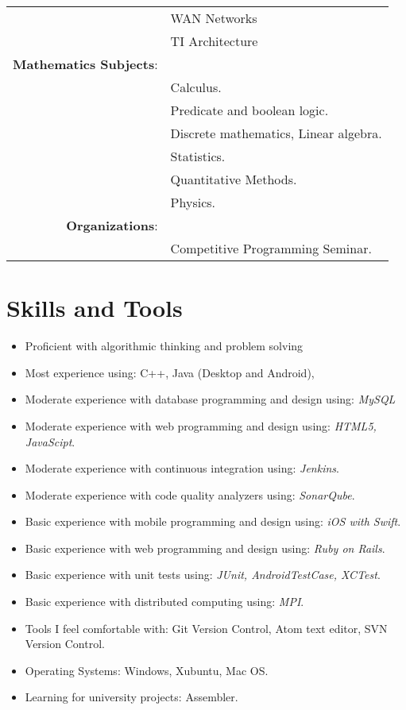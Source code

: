 \documentclass[a4paper,10pt]{article} %
\begin{document}
\begin{tabular}{rl}
&\textbf{}WAN Networks\\
&\textbf{}TI Architecture\\
\textbf{Mathematics Subjects}:\\
&\textbf{}Calculus.\\
&\textbf{}Predicate and boolean logic.\\
&\textbf{}Discrete mathematics, Linear algebra.\\
&\textbf{}Statistics.\\
&\textbf{}Quantitative Methods.\\
&\textbf{}Physics.\\
\textbf{Organizations}:\\
&\textbf{}Competitive Programming Seminar.
\end{tabular}
\newpage


\section{Skills and Tools}
\begin{itemize}
 \item Proficient with algorithmic thinking and problem solving
 \item Most experience using: C++, Java (Desktop and Android),
 \item Moderate experience with database programming and design using: {\sl MySQL}
 \item Moderate experience with web programming and design using: {\sl HTML5, JavaScipt}.
 \item Moderate experience with continuous integration using: {\sl Jenkins}.
 \item Moderate experience with code quality analyzers using: {\sl SonarQube}.
 \item Basic experience with mobile programming and design using: {\sl iOS with Swift}.
 \item Basic experience with web programming and design using: {\sl Ruby on Rails}.
 \item Basic experience with unit tests using: {\sl JUnit, AndroidTestCase, XCTest}.
 \item Basic experience with distributed computing using: {\sl MPI}.
 \item Tools I feel comfortable with: Git Version Control, Atom text editor, SVN Version Control.
 \item Operating Systems: Windows, Xubuntu, Mac OS.
 \item Learning for university projects: Assembler.
\end{itemize}
\end{document}
